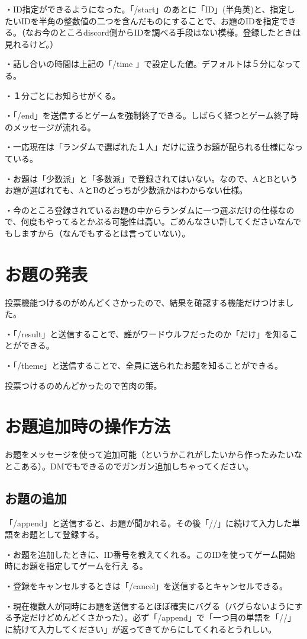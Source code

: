 \documentclass{jsarticle}
\begin{document}
・ID指定ができるようになった。「/start」のあとに「ID」(半角英)と、指定したいIDを半角の整数値の二つを含んだものにすることで、お題のIDを指定できる。（なお今のところdiscord側からIDを調べる手段はない模様。登録したときは見れるけど。）

・話し合いの時間は上記の「/time 」で設定した値。デフォルトは５分になってる。

・１分ごとにお知らせがくる。

・「/end」を送信するとゲームを強制終了できる。しばらく経つとゲーム終了時のメッセージが流れる。

・一応現在は「ランダムで選ばれた１人」だけに違うお題が配られる仕様になっている。

・お題は「少数派」と「多数派」で登録されてはいない。なので、AとBというお題が選ばれても、AとBのどっちが少数派かはわからない仕様。

・今のところ登録されているお題の中からランダムに一つ選ぶだけの仕様なので、何度もやってるとかぶる可能性は高い。ごめんなさい許してくださいなんでもしますから（なんでもするとは言っていない）。

\section{お題の発表}
投票機能つけるのがめんどくさかったので、結果を確認する機能だけつけました。

・「/result」と送信することで、誰がワードウルフだったのか「だけ」を知ることができる。

・「/theme」と送信することで、全員に送られたお題を知ることができる。

投票つけるのめんどかったので苦肉の策。
\section{お題追加時の操作方法}
お題をメッセージを使って追加可能（というかこれがしたいから作ったみたいなとこある）。DMでもできるのでガンガン追加しちゃってください。
\subsection{お題の追加}
「/append」と送信すると、お題が聞かれる。その後「//」に続けて入力した単語をお題として登録する。

・お題を追加したときに、ID番号を教えてくれる。このIDを使ってゲーム開始時にお題を指定してゲームを行え
る。

・登録をキャンセルするときは「/cancel」を送信するとキャンセルできる。

・現在複数人が同時にお題を送信するとほぼ確実にバグる（バグらないようにする予定だけどめんどくさかった）。必ず「/append」で「一つ目の単語を「//」に続けて入力してください」が返ってきてからにしてくれるとうれしい。
\end{document}
